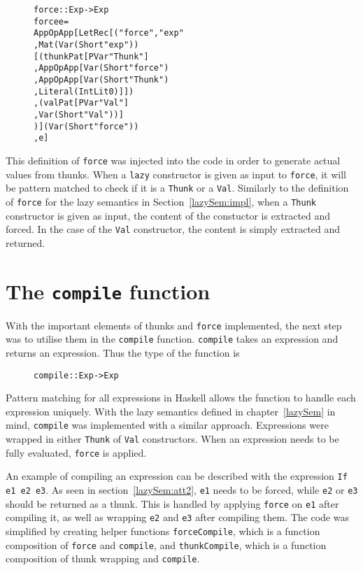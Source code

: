 \begin{figure}[H]
\begin{alltt}
force :: Exp -> Exp
force e =
  App OpApp [LetRec [("force", "exp"
                     , Mat (Var (Short "exp"))
                       [(thunkPat [PVar "Thunk"]
                        , App OpApp [Var (Short "force")
                                    , App OpApp [Var (Short "Thunk")
                                                , Literal (IntLit 0)]])
                       ,(valPat [PVar "Val"]
                        , Var (Short "Val"))]
                     )] (Var (Short "force"))
            , e]
\end{alltt}
\end{figure}

This definition of \texttt{force} was injected into the code in order to
generate actual values from thunks. When a \texttt{lazy} constructor is given
as input to \texttt{force}, it will be pattern matched to check if it is a
\texttt{Thunk} or a \texttt{Val}. Similarly to the definition of \texttt{force}
for the lazy semantics in Section~\ref{lazySem:impl}, when a \texttt{Thunk}
constructor is given as input, the content of the constuctor is extracted and
forced. In the case of the \texttt{Val} constructor, the content is simply
extracted and returned.

\section{The \texttt{compile} function}
With the important elements of thunks and \texttt{force} implemented, the next
step was to utilise them in the \texttt{compile} function. 
\texttt{compile} takes an expression and returns an expression. Thus the type of
the function is

\begin{figure}[H]
\begin{alltt}
  compile :: Exp -> Exp
\end{alltt}
\end{figure}

\noindent Pattern matching for all expressions in Haskell allows the function to
handle each expression uniquely. With the lazy semantics defined in
chapter~\ref{lazySem} in mind, \texttt{compile} was implemented with a similar
approach. Expressions were wrapped in either \texttt{Thunk} of
\texttt{Val} constructors. When an expression needs to be fully evaluated,
\texttt{force} is applied.

An example of compiling an expression can be described with the expression
\texttt{If e1 e2 e3}. As seen in section~\ref{lazySem:att2}, \texttt{e1} needs
to be forced, while \texttt{e2} or \texttt{e3} should be returned as a thunk.
This is handled by applying \texttt{force} on \texttt{e1} after compiling it,
as well as wrapping \texttt{e2} and \texttt{e3} after compiling them.
The code was simplified by creating helper functions \texttt{forceCompile},
which is a function composition of \texttt{force} and \texttt{compile}, and
\texttt{thunkCompile}, which is a function composition of thunk wrapping and
\texttt{compile}.

